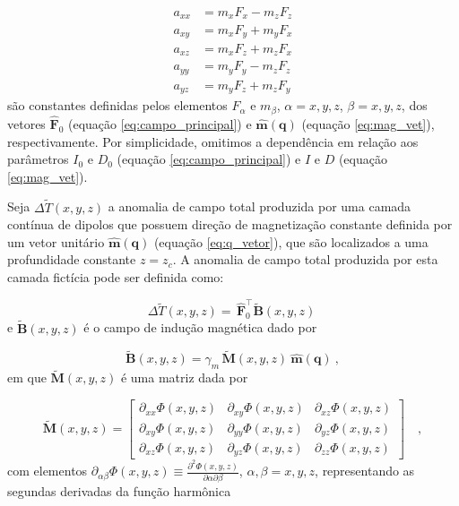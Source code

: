 \begin{equation}
	\begin{split}
		a_{xx} &= m_{x} F_{x} - m_{z} F_{z} \\
		a_{xy} &= m_{x} F_{y} + m_{y} F_{x} \\
		a_{xz} &= m_{x} F_{z} + m_{z} F_{x} \\
		a_{yy} &= m_{y} F_{y} - m_{z} F_{z} \\
		a_{yz} &= m_{y} F_{z} + m_{z} F_{y}
	\end{split}
\label{eq:a-coefficients}
\end{equation}
são constantes definidas pelos elementos $F_{\alpha}$ e $m_{\beta}$, $\alpha = x, y, z$, $\beta = x, y, z$, dos vetores $\hat{\mathbf{F}}_{0}$ (equação \ref{eq:campo_principal}) e $\hat{\mathbf{m}}(\mathbf{q})$ (equação \ref{eq:mag_vet}), respectivamente. Por simplicidade, omitimos a dependência em relação aos parâmetros $I_{0}$ e $D_{0}$ (equação \ref{eq:campo_principal}) e $I$ e $D$ (equação \ref{eq:mag_vet}).

Seja $\Delta \tilde{T}(x, y, z)$ a anomalia de campo total produzida por uma camada contínua de dipolos que possuem direção de magnetização constante definida por um vetor unitário $\hat{\mathbf{m}}(\mathbf{q})$ (equação \ref{eq:q_vetor}), que são localizados a uma profundidade constante $z=z_c$. A anomalia de campo total produzida por esta camada fictícia pode ser definida como: 

\begin{equation}
	\Delta \tilde{T}(x, y, z) = \, \hat{\mathbf{F}}_{0}^{\top} \tilde{\mathbf{B}}(x, y, z) \: 
	\label{eq:tfanomaly-eqlayer}
\end{equation}
e $\tilde{\mathbf{B}}(x, y, z)$ é o campo de indução magnética dado por 

\begin{equation}
	\tilde{\mathbf{B}}(x, y, z) = \gamma_{m} \, \tilde{\mathbf{M}}(x, y, z) \: \hat{\mathbf{m}}(\mathbf{q}) \: ,
	\label{eq:inducao_eqlayer}
\end{equation}
em que $\tilde{\mathbf{M}}(x, y, z)$ é uma matriz dada por 

\begin{equation}
	\tilde{\mathbf{M}}(x, y, z) = \begin{bmatrix}
		\partial_{xx} \Phi(x, y, z) & 
		\partial_{xy} \Phi(x, y, z) &
		\partial_{xz} \Phi(x, y, z) \\
		\partial_{xy} \Phi(x, y, z) & 
		\partial_{yy} \Phi(x, y, z) &
		\partial_{yz} \Phi(x, y, z) \\
		\partial_{xz} \Phi(x, y, z) & 
		\partial_{yz} \Phi(x, y, z) &
		\partial_{zz} \Phi(x, y, z)
	\end{bmatrix} \quad ,
	\label{eq:M-matrix-eqlayer}
\end{equation}
com elementos $\partial_{\alpha\beta} \Phi(x, y, z) \equiv \frac{\partial^{2} \Phi(x, y, z)}{\partial \alpha \partial \beta}$, $\alpha, \beta = x, y, z$, representando as segundas derivadas da função harmônica 

